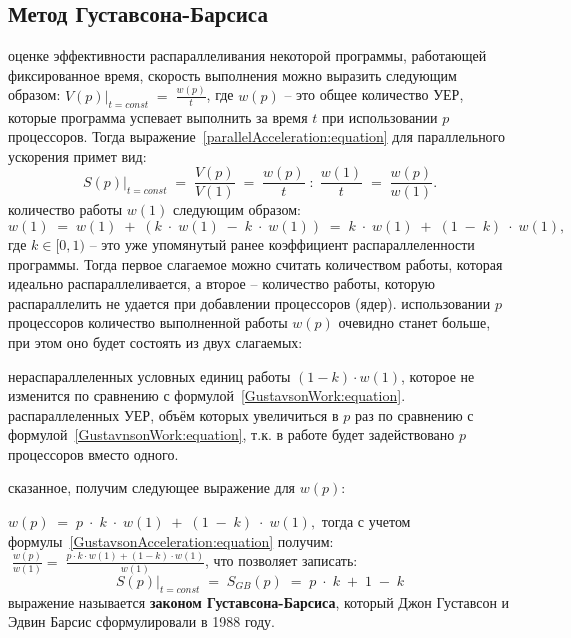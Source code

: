 { %
	\subsection{Метод Густавсона-Барсиса}
	\Large{} оценке эффективности распараллеливания некоторой программы, работающей фиксированное время, скорость выполнения можно выразить следующим образом: $\left.V(p)\right|_{t=const}\;=\;\frac {w(p)}t$, где $w(p)$ – это общее количество УЕР, которые программа успевает выполнить за время $t$ при использовании $p$ процессоров. Тогда выражение~\eqref{parallelAcceleration:equation} для параллельного ускорения примет вид:
	\begin{equation}
		\label{GustavsonAcceleration:equation}
		\left.S(p)\right|_{t=const}\;=\;\frac{V(p)}{V(1)}\;=\;\frac{w(p)}t\;:\;\frac{w(1)}t\;=\;\frac{w(p)}{w(1)}.
	\end{equation}
	 количество работы $w(1)$ следующим образом:
	\begin{equation}
		\label{GustavsonWork:equation}
		w(1)\;=\;w(1)\;+\;(k\;\cdot\;w(1)\;-\;k\;\cdot\;w(1))\;=\;k\;\cdot\;w(1)\;+\;(1\;-\;k)\;\cdot\;w(1),
	\end{equation}
	где $k\in\lbrack0,1)$ – это уже упомянутый ранее коэффициент распараллеленности программы. Тогда первое слагаемое можно считать количеством работы, которая идеально распараллеливается, а второе – количество работы, которую распараллелить не удается при добавлении процессоров (ядер).
	 использовании $p$ процессоров количество выполненной работы $w(p)$ очевидно станет больше, при этом оно  будет состоять из двух слагаемых: 
	\begin{itemize}
		 нераспараллеленных условных единиц работы $(1-k)\cdot w(1)$, которое не изменится по сравнению с формулой~\eqref{GustavsonWork:equation}.
		 распараллеленных УЕР, объём которых увеличиться в $p$ раз по сравнению с формулой~\eqref{GustavnsonWork:equation}, т.к. в работе будет задействовано $p$ процессоров вместо одного.
	\end{itemize}
	 сказанное, получим следующее выражение для $w(p)$:
	\par$w(p)\;=\;p\;\cdot\;k\;\cdot\;w(1)\;+\;(1\;-\;k)\;\cdot\;w(1),$ тогда с учетом формулы~\eqref{GustavsonAcceleration:equation} получим: $\;\frac{w(p)}{w(1)}=\;\frac{p\cdot k\cdot w(1)+(1-k)\cdot w(1)}{w(1)}$, что позволяет записать:
	\begin{equation}
		\left.S(p)\right|_{t=const}\;=\;S_{GB}(p)\;=\;p\;\cdot\;k\;+\;1\;-\;k
	\end{equation}
	 выражение называется \textbf{законом Густавсона-Барсиса}, который Джон Густавсон и Эдвин Барсис сформулировали в 1988 году. 
	\par
}